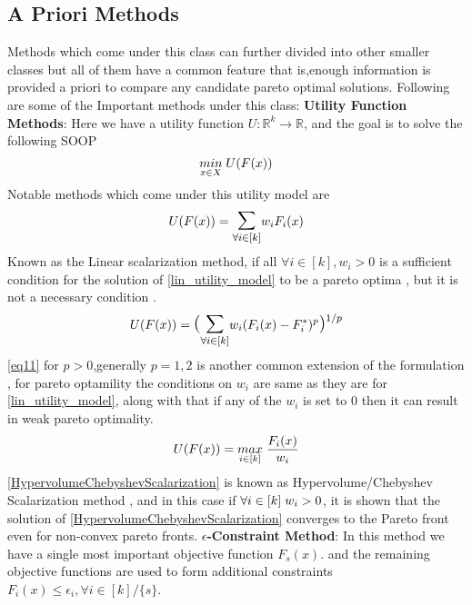 \subsection{A Priori Methods}
Methods which come under this class can further divided into other smaller classes but all of them have a common feature that is,enough information is provided a priori to compare any candidate pareto optimal solutions.
\newline Following are some of the Important methods under this class:
\newline \newline \textbf{Utility Function Methods}: Here we have a utility function $U: \mathbb{R}^k \to \mathbb{R}$, and the goal is to solve the following SOOP
\begin{equation}
    \underset{x \in X}{min}\hspace{1mm} U(F(x))
\end{equation}
\newline Notable methods which come under this utility model are
\begin{equation} \label{lin_utility_model}
    U(F(x)) = \mathlarger{\mathlarger{\sum}}_{\forall i\in [k]} w_i F_i(x)
\end{equation}
\newline Known as the Linear scalarization method, if all $\forall i \in [k], w_i > 0$ is a sufficient condition for the solution of \ref{lin_utility_model} to be a pareto optima \cite{zadeh1963optimality}, but it is not a necessary condition \cite{zionts1989multiple}.
\begin{equation} \label{eq11}
    U(F(x)) = \mathlarger{\mathlarger{( \sum}}_{\forall i\in [k]} w_i (F_i(x)-F^{*}_i)^p \mathlarger{\mathlarger{) }}^{1/p}
\end{equation}
\newline \ref{eq11} for $p>0$,generally $p=1,2$ is another common extension of the formulation \cite{yu1976compromise}, for pareto optamility the conditions on $w_i$ are same as they are for \ref{lin_utility_model}, along with that if any of the $w_i$ is set to $0$ then it can result in weak pareto optimality.
\begin{equation} \label{HypervolumeChebyshevScalarization}
    U(F(x)) = \underset{i\in [k]}{max}\hspace{1mm} \frac{F_i(x)}{w_i}
\end{equation}
\newline \ref{HypervolumeChebyshevScalarization} is known as Hypervolume/Chebyshev Scalarization method \cite{zhang2020random}, and in this case if $\forall i \in [k] \hspace{1mm} w_i>0$, it is shown that the solution of \ref{HypervolumeChebyshevScalarization} converges to the Pareto front even for non-convex pareto fronts.
\newline \newline \textbf{$\epsilon$-Constraint Method}:
In this method\cite{haimes1971bicriterion} we have a single most important objective function $F_s(x)$. and the remaining objective functions are used to form additional constraints $F_i(x) \le \epsilon_i,\forall i \in [k]/\{s\}$.

